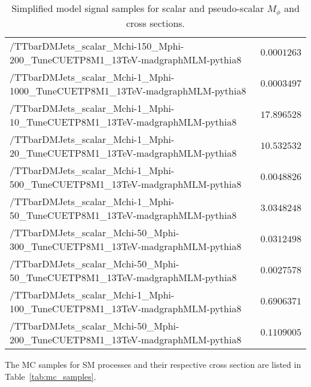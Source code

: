 \begin{table}[!ht]
\begin{tabular}{|l|l|}
/TTbarDMJets\_scalar\_Mchi-150\_Mphi-200\_TuneCUETP8M1\_13TeV-madgraphMLM-pythia8      &$0.0001263$ \\
/TTbarDMJets\_scalar\_Mchi-1\_Mphi-1000\_TuneCUETP8M1\_13TeV-madgraphMLM-pythia8      &  $0.0003497$ \\
/TTbarDMJets\_scalar\_Mchi-1\_Mphi-10\_TuneCUETP8M1\_13TeV-madgraphMLM-pythia8      & $17.896528$ \\
/TTbarDMJets\_scalar\_Mchi-1\_Mphi-20\_TuneCUETP8M1\_13TeV-madgraphMLM-pythia8      & $10.532532$ \\
/TTbarDMJets\_scalar\_Mchi-1\_Mphi-500\_TuneCUETP8M1\_13TeV-madgraphMLM-pythia8      &$0.0048826$ \\
/TTbarDMJets\_scalar\_Mchi-1\_Mphi-50\_TuneCUETP8M1\_13TeV-madgraphMLM-pythia8      &$3.0348248$ \\
/TTbarDMJets\_scalar\_Mchi-50\_Mphi-300\_TuneCUETP8M1\_13TeV-madgraphMLM-pythia8      &$0.0312498$ \\
/TTbarDMJets\_scalar\_Mchi-50\_Mphi-50\_TuneCUETP8M1\_13TeV-madgraphMLM-pythia8      &$0.0027578$ \\
/TTbarDMJets\_scalar\_Mchi-1\_Mphi-100\_TuneCUETP8M1\_13TeV-madgraphMLM-pythia8      &$0.6906371$ \\
/TTbarDMJets\_scalar\_Mchi-50\_Mphi-200\_TuneCUETP8M1\_13TeV-madgraphMLM-pythia8      &$0.1109005$\\
\hline
\end{tabular}
\caption{Simplified model signal samples for scalar and pseudo-scalar $M_{\phi}$ and cross sections.}
\label{tab:ttdm_simplified}
\end{table}

The MC samples for SM processes and their respective cross section are listed in Table~\ref{tab:mc_samples}. %

